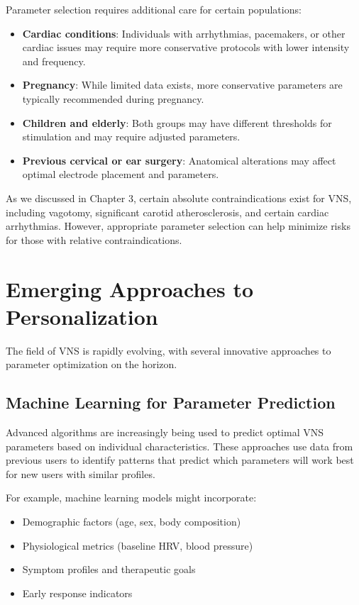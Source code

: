 \documentclass[
  Letterpaper,
]{scrbook}
\providecommand{\tightlist}{%
  \setlength{\itemsep}{0pt}\setlength{\parskip}{0pt}}\usepackage{longtable,booktabs,array}
\begin{document}
Parameter selection requires additional care for certain populations:

\begin{itemize}
\tightlist
\item
  \textbf{Cardiac conditions}: Individuals with arrhythmias, pacemakers,
  or other cardiac issues may require more conservative protocols with
  lower intensity and frequency.
\item
  \textbf{Pregnancy}: While limited data exists, more conservative
  parameters are typically recommended during pregnancy.
\item
  \textbf{Children and elderly}: Both groups may have different
  thresholds for stimulation and may require adjusted parameters.
\item
  \textbf{Previous cervical or ear surgery}: Anatomical alterations may
  affect optimal electrode placement and parameters.
\end{itemize}

As we discussed in Chapter 3, certain absolute contraindications exist
for VNS, including vagotomy, significant carotid atherosclerosis, and
certain cardiac arrhythmias. However, appropriate parameter selection
can help minimize risks for those with relative contraindications.

\section{Emerging Approaches to
Personalization}\label{emerging-approaches-to-personalization}

The field of VNS is rapidly evolving, with several innovative approaches
to parameter optimization on the horizon.

\subsection{Machine Learning for Parameter
Prediction}\label{machine-learning-for-parameter-prediction}

Advanced algorithms are increasingly being used to predict optimal VNS
parameters based on individual characteristics. These approaches use
data from previous users to identify patterns that predict which
parameters will work best for new users with similar profiles.

For example, machine learning models might incorporate:

\begin{itemize}
\tightlist
\item
  Demographic factors (age, sex, body composition)
\item
  Physiological metrics (baseline HRV, blood pressure)
\item
  Symptom profiles and therapeutic goals
\item
  Early response indicators
\end{itemize}
\end{document}
